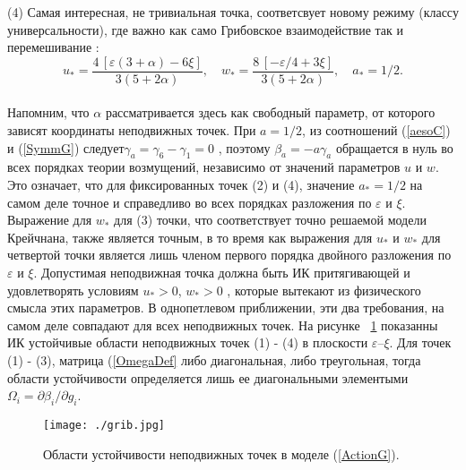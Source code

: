 \documentclass[a4paper,10pt]{article}
\begin{document}
(4) Самая интересная, не тривиальная точка, соответсвует новому режиму (классу универсальности), где важно как само Грибовское взаимодействие так и перемешивание :
\begin{equation}
u_{*} = \frac{4\,[\varepsilon(3+\alpha)-6\xi]}{3(5+2\alpha)}, \quad
w_{*} = \frac{8\,[-\varepsilon/4+3\xi]}{3(5+2\alpha)}, \quad a_{*}=1/2.
\label{wu4}
\end{equation}
\\
Напомним, что  $\alpha$ рассматривается здесь как свободный параметр, от которого зависят координаты неподвижных точек.
При $a=1/2$, из соотношений (\ref{aesoC}) и (\ref{SymmG}) следует$\gamma_{a} = \gamma_{6}-\gamma_{1}=0$ , поэтому $\beta_{a} =-a \gamma_{a}$
 обращается в нуль во всех порядках теории возмущений, независимо от значений параметров $u$ и $w$.
Это означает, что для фиксированных точек (2) и (4), значение $a_{*}=1/2$ на самом деле точное и справедливо во всех порядках разложения по $\varepsilon$ и $\xi$.
Выражение для $w_{*}$ для (3) точки, что соответствует точно решаемой модели Крейчнана, также является точным, в то время как выражения для $u_{*}$ и $w_{*}$
для четвертой точки является лишь членом первого порядка двойного разложения по $\varepsilon$ и $\xi$.
Допустимая неподвижная точка должна быть ИК притягивающей и удовлетворять условиям $u_{*}>0$, $w_{*}>0$ ,
 которые вытекают из физического смысла этих параметров.
В однопетлевом приближении, эти два требования, на самом деле совпадают для всех неподвижных точек.
На рисунке ~\ref{fig:patt} показанны  ИК устойчивые области неподвижных точек (1) - (4) в плоскости $\varepsilon$--$\xi$.
Для точек (1) - (3), матрица (\ref{OmegaDef} либо диагональная, либо треугольная, тогда области устойчивости определяется лишь ее диагональными
элементыми $\Omega_{i} = \partial\beta_{i}/\partial g_{i}$.

\begin{figure}[H]
\begin{center}
\texttt{[image: ./grib.jpg]}
\caption{\label{fig:patt}
Области устойчивости неподвижных точек в моделе
 (\protect\ref{ActionG}).}
\end{center}
\end{figure}
\end{document}
